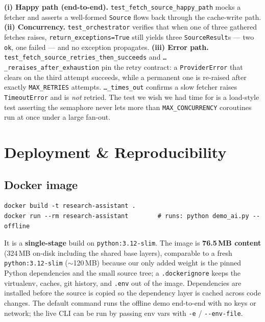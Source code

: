 \documentclass[11pt,a4paper]{article}
\begin{document}
\textbf{(i) Happy path (end-to-end).} \texttt{test\_fetch\_source\_happy\_path} mocks a fetcher
and asserts a well-formed \texttt{Source} flows back through the cache-write path.
\textbf{(ii) Concurrency.} \texttt{test\_orchestrator} verifies that when one of three
gathered fetches raises, \texttt{return\_exceptions=True} still yields three
\texttt{SourceResult}s --- two \texttt{ok}, one failed --- and no exception propagates.
\textbf{(iii) Error path.} \texttt{test\_fetch\_source\_retries\_then\_succeeds} and
\texttt{\dots\_reraises\_after\_exhaustion} pin the retry contract: a \texttt{ProviderError}
that clears on the third attempt succeeds, while a permanent one is re-raised after exactly
\texttt{MAX\_RETRIES} attempts. \texttt{\dots\_times\_out} confirms a slow fetcher raises
\texttt{TimeoutError} and is \emph{not} retried. The test we wish we had time for is a
load-style test asserting the semaphore never lets more than \texttt{MAX\_CONCURRENCY}
coroutines run at once under a large fan-out.

\section{Deployment \& Reproducibility}\label{sec:deploy}

\subsection{Docker image}

\begin{lstlisting}[style=plain]
docker build -t research-assistant .
docker run --rm research-assistant        # runs: python demo_ai.py --offline
\end{lstlisting}

It is a \textbf{single-stage} build on \texttt{python:3.12-slim}. The image is \textbf{76.5\,MB
content} (324\,MB on-disk including the shared base layers), comparable to a fresh
\texttt{python:3.12-slim} ($\sim$120\,MB) because our only added weight is the pinned Python
dependencies and the small source tree; a \texttt{.dockerignore} keeps the virtualenv, caches,
git history, and \texttt{.env} out of the image. Dependencies are installed before the source
is copied so the dependency layer is cached across code changes. The default command runs the
offline demo end-to-end with no keys or network; the live CLI can be run by passing env vars
with \texttt{-e} / \texttt{-{}-env-file}.
\end{document}
